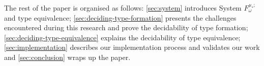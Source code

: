 The rest of the paper is organised as follows: \cref*{sec:system} introduces System $F^{\mu_*;}_\omega$ and type equivalence; \cref*{sec:deciding-type-formation} presents the challenges encountered during this research and prove the decidability of type formation; \cref*{sec:deciding-type-equivalence} explains the decidability of type equivalence; \cref*{sec:implementation} describes our implementation process and validates our work and \cref*{sec:conclusion} wraps up the paper.

